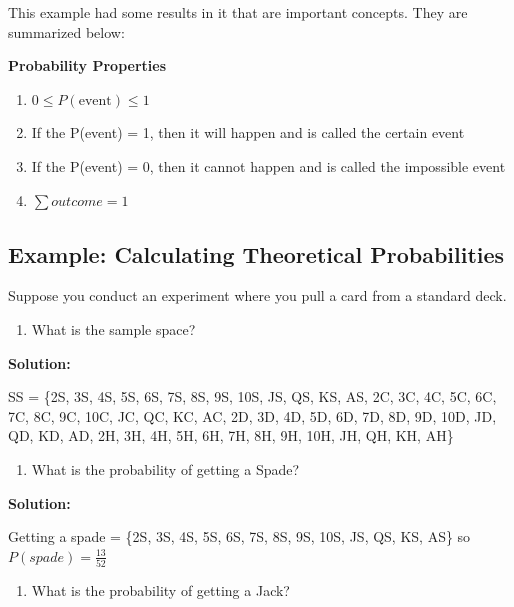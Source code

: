 \documentclass[]{book}
\providecommand{\tightlist}{%
  \setlength{\itemsep}{0pt}\setlength{\parskip}{0pt}}
\begin{document}
This example had some results in it that are important concepts. They are summarized below:

\textbf{Probability Properties}

\begin{enumerate}
\def\labelenumi{\arabic{enumi}.}
\tightlist
\item
  \(0 \le P(\text{event}) \le 1\)
\item
  If the P(event) = 1, then it will happen and is called the certain event
\item
  If the P(event) = 0, then it cannot happen and is called the impossible event
\item
  \(\sum{outcome}=1\)
\end{enumerate}

\hypertarget{example-calculating-theoretical-probabilities-1}{%
\subsection{Example: Calculating Theoretical Probabilities}\label{example-calculating-theoretical-probabilities-1}}

Suppose you conduct an experiment where you pull a card from a standard deck.

\begin{enumerate}
\def\labelenumi{\alph{enumi}.}
\tightlist
\item
  What is the sample space?
\end{enumerate}

\textbf{Solution:}

SS = \{2S, 3S, 4S, 5S, 6S, 7S, 8S, 9S, 10S, JS, QS, KS, AS, 2C, 3C, 4C, 5C, 6C, 7C, 8C, 9C, 10C, JC, QC, KC, AC, 2D, 3D, 4D, 5D, 6D, 7D, 8D, 9D, 10D, JD, QD, KD, AD, 2H, 3H, 4H, 5H, 6H, 7H, 8H, 9H, 10H, JH, QH, KH, AH\}

\begin{enumerate}
\def\labelenumi{\alph{enumi}.}
\setcounter{enumi}{1}
\tightlist
\item
  What is the probability of getting a Spade?
\end{enumerate}

\textbf{Solution:}

Getting a spade = \{2S, 3S, 4S, 5S, 6S, 7S, 8S, 9S, 10S, JS, QS, KS, AS\} so \(P(spade)=\frac{13}{52}\)

\begin{enumerate}
\def\labelenumi{\alph{enumi}.}
\setcounter{enumi}{2}
\tightlist
\item
  What is the probability of getting a Jack?
\end{enumerate}
\end{document}
